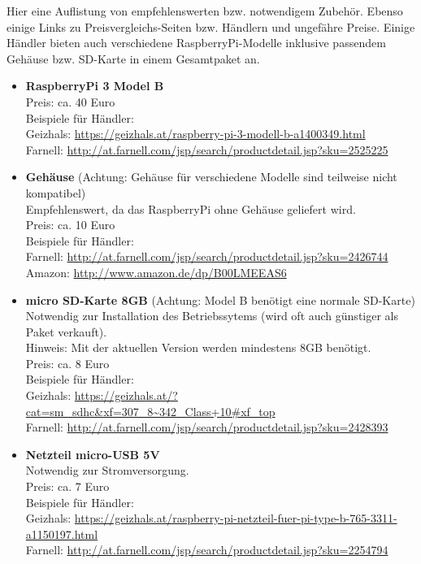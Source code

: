 
Hier eine Auflistung von empfehlenswerten bzw. notwendigem Zubehör. Ebenso einige Links zu Preisvergleichs-Seiten bzw. Händlern und ungefähre Preise.
Einige Händler bieten auch verschiedene RaspberryPi-Modelle inklusive passendem Gehäuse bzw. SD-Karte in einem Gesamtpaket an.
\begin{itemize}
	\item \textbf{RaspberryPi 3 Model B}\\
		Preis: ca. 40 Euro\\
		Beispiele für Händler:\\
		Geizhals: \url{https://geizhals.at/raspberry-pi-3-modell-b-a1400349.html}\\
		Farnell: \url{http://at.farnell.com/jsp/search/productdetail.jsp?sku=2525225}
	\item \textbf{Gehäuse} (Achtung: Gehäuse für verschiedene Modelle sind teilweise nicht kompatibel)\\
		Empfehlenswert, da das RaspberryPi ohne Gehäuse geliefert wird.\\
		Preis: ca. 10 Euro\\
		Beispiele für Händler:\\
		Farnell: \url{http://at.farnell.com/jsp/search/productdetail.jsp?sku=2426744}\\
		Amazon: \url{http://www.amazon.de/dp/B00LMEEAS6}
	\item \textbf{micro SD-Karte 8GB} (Achtung: Model B benötigt eine normale SD-Karte)\\
		Notwendig zur Installation des Betriebssytems (wird oft auch günstiger als Paket verkauft).\\
		Hinweis: Mit der aktuellen Version werden mindestens 8GB benötigt.\\
		Preis: ca. 8 Euro\\
		Beispiele für Händler:\\
		Geizhals: \url{https://geizhals.at/?cat=sm_sdhc&xf=307_8~342_Class+10#xf_top}\\
		Farnell: \url{http://at.farnell.com/jsp/search/productdetail.jsp?sku=2428393}
	\item \textbf{Netzteil micro-USB 5V}\\
		Notwendig zur Stromversorgung.\\
		Preis: ca. 7 Euro\\
		Beispiele für Händler:\\
		Geizhals: \url{https://geizhals.at/raspberry-pi-netzteil-fuer-pi-type-b-765-3311-a1150197.html}\\
		Farnell: \url{http://at.farnell.com/jsp/search/productdetail.jsp?sku=2254794}
\end{itemize}

